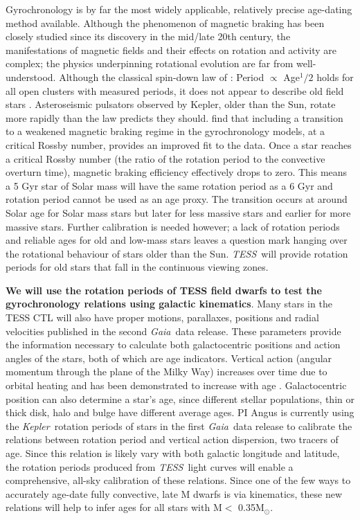 \documentclass[useAMS, usenatbib, preprint, 12pt]{aastex}
\newcommand{\Kepler}{{\it Kepler}}
\newcommand{\kepler}{\Kepler}
\newcommand{\TESS}{{\it TESS}}
\newcommand{\Gaia}{{\it Gaia}}
\newcommand{\eg}{{\it e.g.}}
\begin{document}
Gyrochronology is by far the most widely applicable, relatively precise
age-dating method available.
Although the phenomenon of magnetic braking has been closely studied since its
discovery in the mid/late 20th century, the manifestations of magnetic fields
and their effects on rotation and activity are complex; the physics
underpinning rotational evolution are far from well-understood.
Although the classical spin-down law of \citet{skumanich1972}: Period
$\propto$ Age$^1/2$ holds for all open clusters with measured periods, it does
not appear to describe old field stars \citep{angus2015, van-saders2016}.
Asteroseismic pulsators observed by Kepler, older than the Sun, rotate more
rapidly than the \citet{skumanich1972} law predicts they should.
\citet{van-saders2016} find that including a transition to a weakened magnetic
braking regime in the gyrochronology models, at a critical Rossby number,
provides an improved fit to the data.
Once a star reaches a critical Rossby number (the ratio of the rotation period
to the convective overturn time), magnetic braking efficiency effectively
drops to zero.
This means a 5 Gyr star of Solar mass will have the same rotation period as a
6 Gyr and rotation period cannot be used as an age proxy.
The transition occurs at around Solar age for Solar mass stars but later for
less massive stars and earlier for more massive stars.
Further calibration is needed however; a lack of rotation periods and
reliable ages for old and low-mass stars leaves a question mark hanging over
the rotational behaviour of stars older than the Sun.
\TESS\ will provide rotation periods for old stars that fall in the continuous
viewing zones.

{\bf We will use the rotation periods of TESS field dwarfs to test the
gyrochronology relations using galactic kinematics}.
Many stars in the TESS CTL will also have proper motions, parallaxes,
positions and radial velocities published in the second \Gaia\ data release.
These parameters provide the information necessary to calculate both
galactocentric positions and action angles of the stars, both of which are age
indicators.
Vertical action (angular momentum through the plane of the Milky Way)
increases over time due to orbital heating and has been demonstrated to
increase with age \citep[\eg][]{west2011}.
Galactocentric position can also determine a star's age, since different
stellar populations, thin or thick disk, halo and bulge have different average
ages.
PI Angus is currently using the \kepler\ rotation periods of stars in the
first \Gaia\ data release to calibrate the relations between rotation period
and vertical action dispersion, two tracers of age.
Since this relation is likely vary with both galactic longitude and latitude,
the rotation periods produced from \TESS\ light curves will enable a
comprehensive, all-sky calibration of these relations.
Since one of the few ways to accurately age-date fully convective, late M
dwarfs is via kinematics, these new relations will help to infer ages for all
stars with M$<$ 0.35M$_\odot$.
\end{document}
